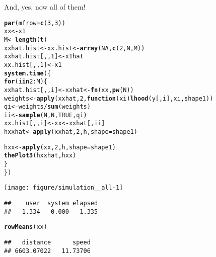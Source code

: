\documentclass[11pt]{article}\usepackage[]{graphicx}\usepackage[]{color}
\makeatletter
\def\maxwidth{ %
  \ifdim\Gin@nat@width>\linewidth
    \linewidth
  \else
    \Gin@nat@width
  \fi
}
\newcommand{\hlnum}[1]{\textcolor[rgb]{0.686,0.059,0.569}{#1}}%
\newcommand{\hlopt}[1]{\textcolor[rgb]{0,0,0}{#1}}%
\newcommand{\hlstd}[1]{\textcolor[rgb]{0.345,0.345,0.345}{#1}}%
\newcommand{\hlkwa}[1]{\textcolor[rgb]{0.161,0.373,0.58}{\textbf{#1}}}%
\newcommand{\hlkwb}[1]{\textcolor[rgb]{0.69,0.353,0.396}{#1}}%
\newcommand{\hlkwc}[1]{\textcolor[rgb]{0.333,0.667,0.333}{#1}}%
\newcommand{\hlkwd}[1]{\textcolor[rgb]{0.737,0.353,0.396}{\textbf{#1}}}%
\newenvironment{kframe}{%
 \def\at@end@of@kframe{}%
 \ifinner\ifhmode%
  \def\at@end@of@kframe{\end{minipage}}%
  \begin{minipage}{\columnwidth}%
 \fi\fi%
 \def\FrameCommand##1{\hskip\@totalleftmargin \hskip-\fboxsep
 \colorbox{shadecolor}{##1}\hskip-\fboxsep
     \hskip-\linewidth \hskip-\@totalleftmargin \hskip\columnwidth}%
 \MakeFramed {\advance\hsize-\width
   \@totalleftmargin\z@ \linewidth\hsize
   \@setminipage}}%
 {\par\unskip\endMakeFramed%
 \at@end@of@kframe}
\newenvironment{knitrout}{}{} %
\makeatother
\begin{document}
And, yes, now all of them!

\begin{knitrout}
\color{fgcolor}\begin{kframe}
\begin{alltt}
\hlkwd{par}\hlstd{(}\hlkwc{mfrow} \hlstd{=} \hlkwd{c}\hlstd{(}\hlnum{3}\hlstd{,} \hlnum{3}\hlstd{))}
\hlstd{xx} \hlkwb{<-} \hlstd{x1}
\hlstd{M} \hlkwb{<-} \hlkwd{length}\hlstd{(t)}
\hlstd{xxhat.hist} \hlkwb{<-} \hlstd{xx.hist} \hlkwb{<-} \hlkwd{array}\hlstd{(}\hlnum{NA}\hlstd{,} \hlkwd{c}\hlstd{(}\hlnum{2}\hlstd{, N, M))}
\hlstd{xxhat.hist[,,}\hlnum{1}\hlstd{]} \hlkwb{<-} \hlstd{x1hat}
\hlstd{xx.hist[,,}\hlnum{1}\hlstd{]} \hlkwb{<-} \hlstd{x1}
\hlkwd{system.time}\hlstd{(\{}
    \hlkwa{for} \hlstd{(i} \hlkwa{in} \hlnum{2}\hlopt{:}\hlstd{M) \{}
        \hlstd{xxhat.hist[,,i]} \hlkwb{<-} \hlstd{xxhat} \hlkwb{<-} \hlkwd{fn}\hlstd{(xx,} \hlkwd{pw}\hlstd{(N))}
        \hlstd{weights} \hlkwb{<-} \hlkwd{apply}\hlstd{(xxhat,} \hlnum{2}\hlstd{,} \hlkwa{function}\hlstd{(}\hlkwc{xi}\hlstd{)} \hlkwd{lhood}\hlstd{(y[, i], xi, shape1))}
        \hlstd{qi} \hlkwb{<-} \hlstd{weights} \hlopt{/} \hlkwd{sum}\hlstd{(weights)}
        \hlstd{ii} \hlkwb{<-} \hlkwd{sample}\hlstd{(N, N,} \hlnum{TRUE}\hlstd{, qi)}
        \hlstd{xx.hist[,,i]} \hlkwb{<-} \hlstd{xx} \hlkwb{<-} \hlstd{xxhat[, ii]}
        \hlstd{hxxhat} \hlkwb{<-} \hlkwd{apply}\hlstd{(xxhat,} \hlnum{2}\hlstd{, h,} \hlkwc{shape} \hlstd{= shape1)}

        \hlstd{hxx} \hlkwb{<-} \hlkwd{apply}\hlstd{(xx,} \hlnum{2}\hlstd{, h,} \hlkwc{shape} \hlstd{= shape1)}
        \hlkwd{thePlot3}\hlstd{(hxxhat, hxx)}
    \hlstd{\}}
\hlstd{\})}
\end{alltt}
\end{kframe}

{\centering \texttt{[image: figure/simulation\_\_all-1]} 

}


\begin{kframe}\begin{verbatim}
##    user  system elapsed 
##   1.334   0.000   1.335
\end{verbatim}
\begin{alltt}
\hlkwd{rowMeans}\hlstd{(xx)}
\end{alltt}
\begin{verbatim}
##   distance      speed 
## 6603.07022   11.73706
\end{verbatim}
\end{kframe}
\end{knitrout}
\end{document}
